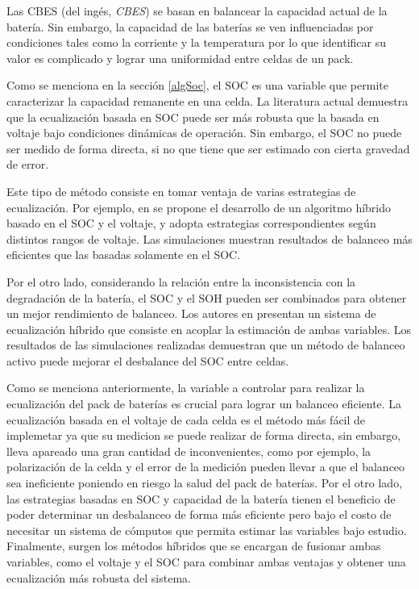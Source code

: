 \documentclass[10pt,a4paper]{article}
\newcounter{subsubsubsection}[subsubsection]
\begin{document}
Las \acrshort{CBES} (del ing\'es, \emph{\acrlong{CBES}}) se basan en balancear
la capacidad actual de la bater\'ia. Sin embargo, la capacidad de las bater\'ias
se ven influenciadas por condiciones tales como la corriente y la temperatura
por lo que identificar su valor es complicado y lograr una uniformidad entre
celdas de un pack.


Como se menciona en la secci\'on \ref{algSoc}, el \acrshort{SOC} es una variable
que permite caracterizar la capacidad remanente en una celda. La literatura
actual demuestra que la ecualizaci\'on basada en \acrshort{SOC} puede ser m\'as 
robusta que la basada en voltaje bajo condiciones din\'amicas de operaci\'on.
Sin embargo, el \acrshort{SOC} no puede ser medido de forma directa, si no que
tiene que ser estimado con cierta gravedad de error.


Este tipo de m\'etodo consiste en tomar ventaja de varias estrategias de
ecualizaci\'on. Por ejemplo, en \cite{ZHANG20194702} se propone el desarrollo de 
un algoritmo h\'ibrido basado en el \acrshort{SOC} y el voltaje, y adopta 
estrategias correspondientes seg\'un distintos rangos de voltaje. Las 
simulaciones muestran resultados de balanceo m\'as eficientes que las basadas 
solamente en el \acrshort{SOC}. 

Por el otro lado, considerando la relaci\'on entre la inconsistencia con la
degradaci\'on de la bater\'ia, el \acrshort{SOC} y el \acrshort{SOH} pueden ser
combinados para obtener un mejor rendimiento de balanceo. Los autores en
\cite{REN2019908} presentan un sistema de ecualizaci\'on h\'ibrido que consiste 
en acoplar la estimaci\'on de ambas variables. Los resultados de las 
simulaciones realizadas demuestran que un m\'etodo de balanceo activo puede 
mejorar el desbalance del \acrshort{SOC} entre celdas.


Como se menciona anteriormente, la variable a controlar para realizar la
ecualizaci\'on del pack de bater\'ias es crucial para lograr un balanceo
eficiente. La ecualizaci\'on basada en el voltaje de cada celda es el m\'etodo
m\'as f\'acil de implemetar ya que su medicion se puede realizar de forma
directa, sin embargo, lleva apareado una gran cantidad de inconvenientes, como
por ejemplo, la polarizaci\'on de la celda y el error de la medici\'on pueden
llevar a que el balanceo sea ineficiente poniendo en riesgo la salud del pack
de bater\'ias. Por el otro lado, las estrategias basadas en \acrshort{SOC} y
capacidad de la bater\'ia tienen el beneficio de poder determinar un desbalanceo
de forma m\'as eficiente pero bajo el costo de necesitar un sistema de
c\'omputos que permita estimar las variables bajo estudio. Finalmente, surgen
los m\'etodos h\'ibridos que se encargan de fusionar ambas variables, como el
voltaje y el \acrshort{SOC} para combinar ambas ventajas y obtener una
ecualizaci\'on m\'as robusta del sistema.
\end{document}

